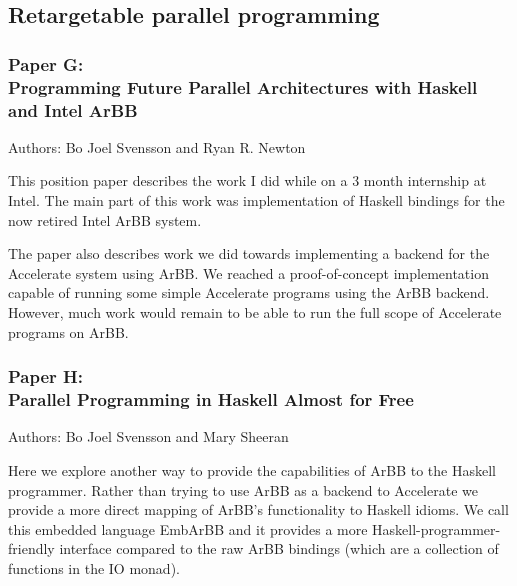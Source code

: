 \documentclass[a4paper]{book}
\newcommand{\paperG}{Paper G}
\newcommand{\paperGTitle}{Programming Future Parallel Architectures with Haskell and Intel ArBB}
\newcommand{\paperH}{Paper H}
\newcommand{\paperHTitle}{Parallel Programming in Haskell Almost for Free}
\begin{document}
\subsection{Retargetable parallel programming} 

\subsubsection{\paperG: \\ \paperGTitle}

Authors: Bo Joel Svensson and Ryan R. Newton

\vspace{5mm}

\noindent This position paper describes the work I did while on a 3 month internship at 
Intel. The main part of this work was implementation of Haskell bindings 
for the now retired Intel ArBB system. 

The paper also describes work we did towards implementing a backend for the 
Accelerate system using ArBB. We reached a proof-of-concept implementation 
capable of running some simple Accelerate programs using the ArBB backend.
However, much work would remain to be able to run the full scope of Accelerate 
programs on ArBB.  

\subsubsection{\paperH: \\ \paperHTitle}

Authors: Bo Joel Svensson and Mary Sheeran 

\vspace{5mm}

\noindent Here we explore another way to provide the capabilities of ArBB to the 
Haskell programmer. Rather than trying to use ArBB as a backend to Accelerate 
we provide a more direct mapping of ArBB's functionality to Haskell idioms. 
We call this embedded language EmbArBB and it provides a more Haskell-programmer-friendly 
interface compared to the raw ArBB bindings (which are a collection of functions 
in the IO monad). 

%
%
\end{document}
